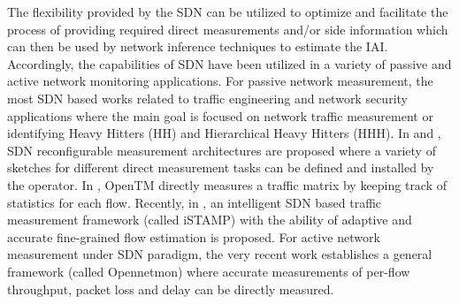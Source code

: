 The flexibility provided by the SDN can be utilized to optimize and facilitate the process of providing required direct measurements and/or side information which can then be used by network inference techniques to estimate the IAI. Accordingly, the capabilities of SDN have been utilized in a variety of passive and active network monitoring applications. For passive network measurement, the most SDN based works related to traffic engineering and network security applications where the main goal is focused on network traffic measurement or identifying Heavy Hitters (HH) and Hierarchical Heavy Hitters (HHH). In \cite{MYu:2011} and \cite{MYu:2013}, SDN reconfigurable measurement architectures are proposed where a variety of sketches for different direct measurement tasks can be defined and installed by the operator. In \cite{Tootoonchian:2010}, OpenTM directly measures a traffic matrix by keeping track of statistics for each flow. Recently, in \cite{IF14iSTAMP:2014}, an intelligent SDN based traffic measurement framework (called iSTAMP) with the ability of adaptive and accurate fine-grained flow estimation is proposed. For active network measurement under SDN paradigm, the very recent work \cite{Adrichen:2014} establishes a general framework (called Opennetmon) where accurate measurements of per-flow throughput, packet loss and delay can be directly measured.

